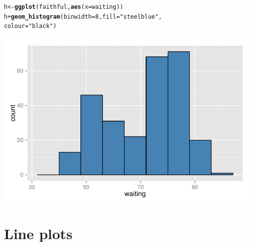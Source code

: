 \documentclass{beamer}\usepackage[]{graphicx}\usepackage[]{color}
\makeatletter
\newcommand{\hlnum}[1]{\textcolor[rgb]{0.686,0.059,0.569}{#1}}%
\newcommand{\hlstr}[1]{\textcolor[rgb]{0.192,0.494,0.8}{#1}}%
\newcommand{\hlopt}[1]{\textcolor[rgb]{0,0,0}{#1}}%
\newcommand{\hlstd}[1]{\textcolor[rgb]{0.345,0.345,0.345}{#1}}%
\newcommand{\hlkwb}[1]{\textcolor[rgb]{0.69,0.353,0.396}{#1}}%
\newcommand{\hlkwc}[1]{\textcolor[rgb]{0.333,0.667,0.333}{#1}}%
\newcommand{\hlkwd}[1]{\textcolor[rgb]{0.737,0.353,0.396}{\textbf{#1}}}%
\newenvironment{kframe}{%
 \def\at@end@of@kframe{}%
 \ifinner\ifhmode%
  \def\at@end@of@kframe{\end{minipage}}%
  \begin{minipage}{\columnwidth}%
 \fi\fi%
 \def\FrameCommand##1{\hskip\@totalleftmargin \hskip-\fboxsep
 \colorbox{shadecolor}{##1}\hskip-\fboxsep
     \hskip-\linewidth \hskip-\@totalleftmargin \hskip\columnwidth}%
 \MakeFramed {\advance\hsize-\width
   \@totalleftmargin\z@ \linewidth\hsize
   \@setminipage}}%
 {\par\unskip\endMakeFramed%
 \at@end@of@kframe}
\newenvironment{knitrout}{}{} %
\makeatother
\begin{document}
\begin{frame}[fragile]
\begin{knitrout}\footnotesize
{}\color{fgcolor}\begin{kframe}
\begin{alltt}
\hlstd{h} \hlkwb{<-} \hlkwd{ggplot}\hlstd{(faithful,} \hlkwd{aes}\hlstd{(}\hlkwc{x} \hlstd{= waiting))}
\hlstd{h} \hlopt{+} \hlkwd{geom_histogram}\hlstd{(}\hlkwc{binwidth} \hlstd{=} \hlnum{8}\hlstd{,} \hlkwc{fill} \hlstd{=} \hlstr{"steelblue"}\hlstd{,}
\hlkwc{colour} \hlstd{=} \hlstr{"black"}\hlstd{)}
\end{alltt}
\end{kframe}

{\centering \includegraphics[width=.75\linewidth]{figure/histogra} 

}



\end{knitrout}

\end{frame}


\section*{Line plots}
\frame{\sectionpage}

\end{document}
